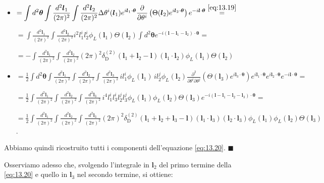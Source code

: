 \documentclass[a4paper,10pt]{article}
\newcommand{\B}{\boldsymbol}
\begin{document}
\begin{itemize}
    \item[(I)] $ = \displaystyle \int d^2 \B \theta \int \frac{d^2 \B l_1}{(2\pi)^2} \int \frac{d^2 \B l_2}{(2\pi)^2} \Delta \theta^i (\B l_1) e^{i \B l_1 \cdot \B\theta} \frac{\partial}{\partial \theta^i} \left( \Theta(\B l_2) e^{i \B l_2 \cdot \B\theta} \right) e^{-i \B l \cdot \B\theta} \overset{\eqref{eq:13.19}}{=} $

        $ = \displaystyle \int \frac{d^2 \B l_1}{(2\pi)^2} \int \frac{d^2 \B l_2}{(2\pi)^2} i^2 l_1^i l_2^i \phi_L(\B l_1) \Theta(\B l_2) \int d^2 \B \theta e^{-i(\B l - \B l_1 - \B l_2) \cdot \B \theta} = $
        
        $ = \displaystyle -\int \frac{d^2 \B l_1}{(2\pi)^2} \int \frac{d^2 \B l_2}{(2\pi)^2} (2\pi)^2 \delta_{\text{D}}^{(2)}(\boldsymbol{l}_1 + \boldsymbol{l}_2 - \boldsymbol{l}) (\boldsymbol{l}_1 \cdot \boldsymbol{l}_2) \phi_L(\boldsymbol{l}_1) \Theta(\boldsymbol{l}_2) $
    
    \item[(II)] $ = \displaystyle \frac{1}{2} \int d^2 \B \theta \int \frac{d^2 \B l_1}{(2\pi)^2} \int \frac{d^2 \B l_2}{(2\pi)^2} \int \frac{d^2 \B l_3}{(2\pi)^2} \, i l_1^i \phi_L(\B l_1) \, i l_2^j \phi_L(\B l_2) \frac{\partial^2}{\partial \theta^i \partial \theta^j} \left( \Theta(\B l_3) e^{i \B l_3 \cdot \B \theta} \right) e^{i \B l_1 \cdot \B \theta} e^{i \B l_2 \cdot \B \theta} e^{-i \B l \cdot \B \theta} = $
        
    $ = \displaystyle \frac{1}{2} \int \frac{d^2 \B l_1}{(2\pi)^2} \int \frac{d^2 \B l_2}{(2\pi)^2} \int \frac{d^2 \B l_3}{(2\pi)^2} \, i^4 l_1^i l_3^i l_2^j l_3^j \phi_L(\B l_1) \phi_L(\B l_2) \Theta(\B l_3) e^{-i (\B l - \B l_1 - \B l_2 - \B l_3) \cdot \B \theta} = $

    $ = \displaystyle \frac{1}{2} \int \frac{d^2 \B l_1}{(2\pi)^2} \int \frac{d^2 \B l_2}{(2\pi)^2} \int \frac{d^2 \B l_3}{(2\pi)^2} (2\pi)^2 \delta_{\text{D}}^{(2)}(\boldsymbol{l}_1 + \boldsymbol{l}_2 + \boldsymbol{l}_3 - \boldsymbol{l})(\boldsymbol{l}_1 \cdot \boldsymbol{l}_3) (\boldsymbol{l}_2 \cdot \boldsymbol{l}_3) \phi_L(\boldsymbol{l}_1) \phi_L(\boldsymbol{l}_2) \Theta(\boldsymbol{l}_3) $ .
\end{itemize}

Abbiamo quindi ricostruito tutti i componenti dell'equazione \eqref{eq:13.20}. \hfill $\blacksquare$

Osserviamo adesso che, svolgendo l'integrale in $\B l_2$ del primo termine della \eqref{eq:13.20} e quello in $\B l_3$ nel secondo termine, si ottiene:
\end{document}
